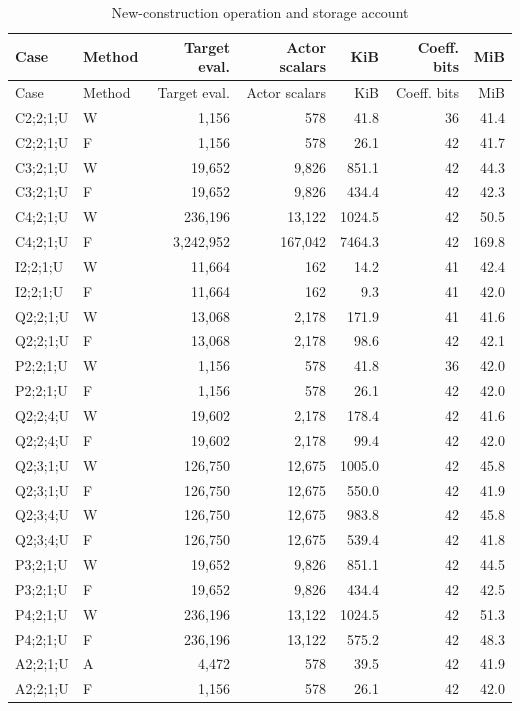 {\small
\setlength{\tabcolsep}{3pt}
\begin{longtable}{@{}llrrrrr@{}}
\caption{New-construction operation and storage account}\label{tab:work50}\\
\toprule
Case & Method & Target eval. & Actor scalars & KiB & Coeff. bits & MiB \\
\midrule
\endfirsthead
\toprule
Case & Method & Target eval. & Actor scalars & KiB & Coeff. bits & MiB \\
\midrule
\endhead
\bottomrule
\endfoot
C2;2;1;U & W & 1,156 & 578 & 41.8 & 36 & 41.4 \\
C2;2;1;U & F & 1,156 & 578 & 26.1 & 42 & 41.7 \\
C3;2;1;U & W & 19,652 & 9,826 & 851.1 & 42 & 44.3 \\
C3;2;1;U & F & 19,652 & 9,826 & 434.4 & 42 & 42.3 \\
C4;2;1;U & W & 236,196 & 13,122 & 1024.5 & 42 & 50.5 \\
C4;2;1;U & F & 3,242,952 & 167,042 & 7464.3 & 42 & 169.8 \\
I2;2;1;U & W & 11,664 & 162 & 14.2 & 41 & 42.4 \\
I2;2;1;U & F & 11,664 & 162 & 9.3 & 41 & 42.0 \\
Q2;2;1;U & W & 13,068 & 2,178 & 171.9 & 41 & 41.6 \\
Q2;2;1;U & F & 13,068 & 2,178 & 98.6 & 42 & 42.1 \\
P2;2;1;U & W & 1,156 & 578 & 41.8 & 36 & 42.0 \\
P2;2;1;U & F & 1,156 & 578 & 26.1 & 42 & 42.0 \\
Q2;2;4;U & W & 19,602 & 2,178 & 178.4 & 42 & 41.6 \\
Q2;2;4;U & F & 19,602 & 2,178 & 99.4 & 42 & 42.0 \\
Q2;3;1;U & W & 126,750 & 12,675 & 1005.0 & 42 & 45.8 \\
Q2;3;1;U & F & 126,750 & 12,675 & 550.0 & 42 & 41.9 \\
Q2;3;4;U & W & 126,750 & 12,675 & 983.8 & 42 & 45.8 \\
Q2;3;4;U & F & 126,750 & 12,675 & 539.4 & 42 & 41.8 \\
P3;2;1;U & W & 19,652 & 9,826 & 851.1 & 42 & 44.5 \\
P3;2;1;U & F & 19,652 & 9,826 & 434.4 & 42 & 42.5 \\
P4;2;1;U & W & 236,196 & 13,122 & 1024.5 & 42 & 51.3 \\
P4;2;1;U & F & 236,196 & 13,122 & 575.2 & 42 & 48.3 \\
A2;2;1;U & A & 4,472 & 578 & 39.5 & 42 & 41.9 \\
A2;2;1;U & F & 1,156 & 578 & 26.1 & 42 & 42.0 \\
\end{longtable}
}
